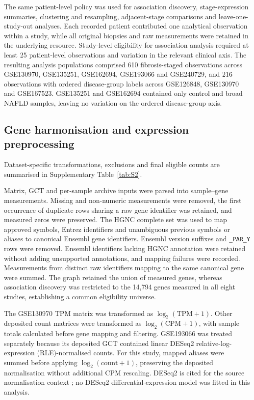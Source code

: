 \documentclass[11pt,a4paper]{article}
\begin{document}
The same patient-level policy was used for association discovery, stage-expression summaries, clustering and resampling, adjacent-stage comparisons and leave-one-study-out analyses. Each recorded patient contributed one analytical observation within a study, while all original biopsies and raw measurements were retained in the underlying resource. Study-level eligibility for association analysis required at least 25 patient-level observations and variation in the relevant clinical axis. The resulting analysis populations comprised 610 fibrosis-staged observations across GSE130970, GSE135251, GSE162694, GSE193066 and GSE240729, and 216 observations with ordered disease-group labels across GSE126848, GSE130970 and GSE167523. GSE135251 and GSE162694 contained only control and broad NAFLD samples, leaving no variation on the ordered disease-group axis.

\subsection*{Gene harmonisation and expression preprocessing}
Dataset-specific transformations, exclusions and final eligible counts are summarised in Supplementary Table~\ref{tab:S2}.

Matrix, GCT and per-sample archive inputs were parsed into sample--gene measurements. Missing and non-numeric measurements were removed, the first occurrence of duplicate rows sharing a raw gene identifier was retained, and measured zeros were preserved. The HGNC complete set was used to map approved symbols, Entrez identifiers and unambiguous previous symbols or aliases to canonical Ensembl gene identifiers. Ensembl version suffixes and \texttt{\_PAR\_Y} rows were removed. Ensembl identifiers lacking HGNC annotation were retained without adding unsupported annotations, and mapping failures were recorded. Measurements from distinct raw identifiers mapping to the same canonical gene were summed. The graph retained the union of measured genes, whereas association discovery was restricted to the 14,794 genes measured in all eight studies, establishing a common eligibility universe.

The GSE130970 TPM matrix was transformed as \(\log_2(\mathrm{TPM}+1)\). Other deposited count matrices were transformed as \(\log_2(\mathrm{CPM}+1)\), with sample totals calculated before gene mapping and filtering. GSE193066 was treated separately because its deposited GCT contained linear DESeq2 relative-log-expression (RLE)-normalised counts. For this study, mapped aliases were summed before applying \(\log_2(\mathrm{count}+1)\), preserving the deposited normalisation without additional CPM rescaling. DESeq2 is cited for the source normalisation context \cite{ref9}; no DESeq2 differential-expression model was fitted in this analysis.
\end{document}
